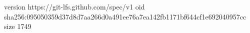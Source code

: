 version https://git-lfs.github.com/spec/v1
oid sha256:095050359d37d8d7aa266d0a491ee76a7ea142fb1171bf644cf1e692040957cc
size 1749
